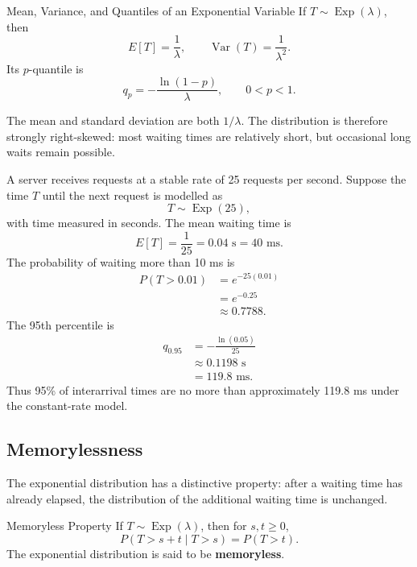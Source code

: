 \begin{theorem}{Mean, Variance, and Quantiles of an Exponential Variable}
If $T\sim\operatorname{Exp}(\lambda)$, then
\[
    E[T]=\frac{1}{\lambda},
    \qquad
    \operatorname{Var}(T)=\frac{1}{\lambda^2}.
\]
Its $p$-quantile is
\[
    q_p=-\frac{\ln(1-p)}{\lambda},
    \qquad 0<p<1.
\]
\end{theorem}

The mean and standard deviation are both $1/\lambda$. The distribution is therefore strongly right-skewed: most waiting times are relatively short, but occasional long waits remain possible.

\begin{example}\par
A server receives requests at a stable rate of 25 requests per second. Suppose the time $T$ until the next request is modelled as
\[
    T\sim\operatorname{Exp}(25),
\]
with time measured in seconds. The mean waiting time is
\[
    E[T]=\frac{1}{25}=0.04\text{ s}=40\text{ ms}.
\]
The probability of waiting more than 10 ms is
\[
\begin{aligned}
P(T>0.01)
  &=e^{-25(0.01)}\\
  &=e^{-0.25}\\
  &\approx0.7788.
\end{aligned}
\]
The 95th percentile is
\[
\begin{aligned}
q_{0.95}
  &=-\frac{\ln(0.05)}{25}\\
  &\approx0.1198\text{ s}\\
  &=119.8\text{ ms}.
\end{aligned}
\]
Thus 95\% of interarrival times are no more than approximately 119.8 ms under the constant-rate model.
\end{example}

\subsection{Memorylessness}

The exponential distribution has a distinctive property: after a waiting time has already elapsed, the distribution of the additional waiting time is unchanged.

\begin{theorem}{Memoryless Property}
If $T\sim\operatorname{Exp}(\lambda)$, then for $s,t\geq0$,
\[
    P(T>s+t\mid T>s)=P(T>t).
\]
The exponential distribution is said to be \textbf{memoryless}.
\end{theorem}

